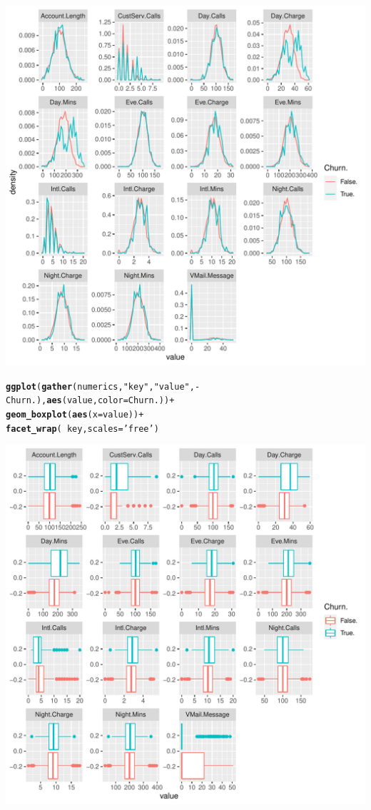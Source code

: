 \documentclass{article}\usepackage[]{graphicx}\usepackage[]{color}
\makeatletter
\def\maxwidth{ %
  \ifdim\Gin@nat@width>\linewidth
    \linewidth
  \else
    \Gin@nat@width
  \fi
}
\newcommand{\hlstr}[1]{\textcolor[rgb]{0.192,0.494,0.8}{#1}}%
\newcommand{\hlopt}[1]{\textcolor[rgb]{0,0,0}{#1}}%
\newcommand{\hlstd}[1]{\textcolor[rgb]{0.345,0.345,0.345}{#1}}%
\newcommand{\hlkwc}[1]{\textcolor[rgb]{0.333,0.667,0.333}{#1}}%
\newcommand{\hlkwd}[1]{\textcolor[rgb]{0.737,0.353,0.396}{\textbf{#1}}}%
\newenvironment{kframe}{%
 \def\at@end@of@kframe{}%
 \ifinner\ifhmode%
  \def\at@end@of@kframe{\end{minipage}}%
  \begin{minipage}{\columnwidth}%
 \fi\fi%
 \def\FrameCommand##1{\hskip\@totalleftmargin \hskip-\fboxsep
 \colorbox{shadecolor}{##1}\hskip-\fboxsep
     \hskip-\linewidth \hskip-\@totalleftmargin \hskip\columnwidth}%
 \MakeFramed {\advance\hsize-\width
   \@totalleftmargin\z@ \linewidth\hsize
   \@setminipage}}%
 {\par\unskip\endMakeFramed%
 \at@end@of@kframe}
\newenvironment{knitrout}{}{} %
\makeatother
\begin{document}
\begin{description}
\begin{knitrout}
\begin{kframe}
\end{kframe}
\includegraphics[width=\maxwidth]{figure/Overviews_plots_grouped-2} 
\begin{kframe}\begin{alltt}
\hlkwd{ggplot}\hlstd{(}\hlkwd{gather}\hlstd{(numerics,} \hlstr{"key"}\hlstd{,} \hlstr{"value"}\hlstd{,} \hlopt{-}\hlstd{Churn.),} \hlkwd{aes}\hlstd{(value,} \hlkwc{color}\hlstd{=Churn.))} \hlopt{+}
  \hlkwd{geom_boxplot}\hlstd{(}\hlkwd{aes}\hlstd{(}\hlkwc{x}\hlstd{=value))} \hlopt{+}
  \hlkwd{facet_wrap}\hlstd{(}\hlopt{~}\hlstd{key,} \hlkwc{scales}\hlstd{=}\hlstr{'free'}\hlstd{)}
\end{alltt}
\end{kframe}
\includegraphics[width=\maxwidth]{figure/Overviews_plots_grouped-3} 


\end{knitrout}
\end{description}
\end{document}

